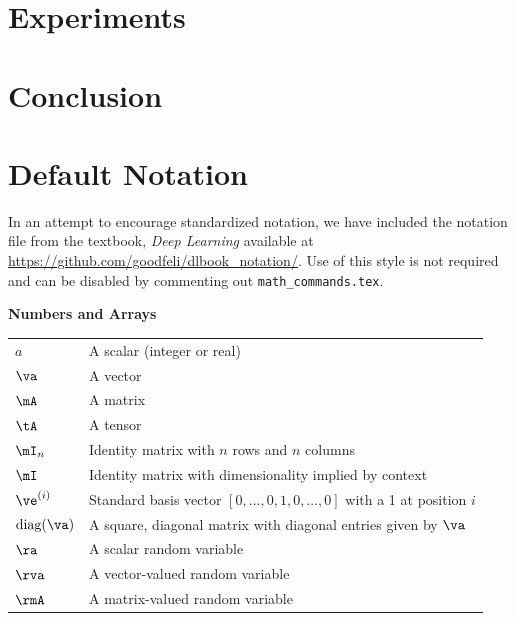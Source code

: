 \documentclass{article} %
\begin{document}
\section{Experiments}

\section{Conclusion}



\section{Default Notation}

In an attempt to encourage standardized notation, we have included the
notation file from the textbook, \textit{Deep Learning}
\cite{goodfellow2016deep} available at
\url{https://github.com/goodfeli/dlbook_notation/}.  Use of this style
is not required and can be disabled by commenting out
\texttt{math\_commands.tex}.


\centerline{\bf Numbers and Arrays}
\bgroup
\def\arraystretch{1.5}
\begin{tabular}{p{1in}p{3.25in}}
$\displaystyle a$ & A scalar (integer or real)\\
$\displaystyle \va$ & A vector\\
$\displaystyle \mA$ & A matrix\\
$\displaystyle \tA$ & A tensor\\
$\displaystyle \mI_n$ & Identity matrix with $n$ rows and $n$ columns\\
$\displaystyle \mI$ & Identity matrix with dimensionality implied by context\\
$\displaystyle \ve^{(i)}$ & Standard basis vector $[0,\dots,0,1,0,\dots,0]$ with a 1 at position $i$\\
$\displaystyle \text{diag}(\va)$ & A square, diagonal matrix with diagonal entries given by $\va$\\
$\displaystyle \ra$ & A scalar random variable\\
$\displaystyle \rva$ & A vector-valued random variable\\
$\displaystyle \rmA$ & A matrix-valued random variable\\
\end{tabular}
\egroup
\vspace{0.25cm}
\end{document}
